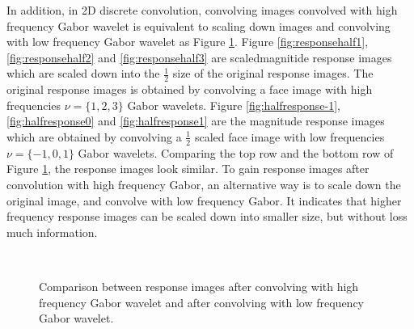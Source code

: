 In addition, in 2D discrete convolution, convolving images convolved with high frequency Gabor wavelet is equivalent to scaling down images and convolving with low frequency Gabor wavelet as \mbox{Figure} \ref{fig:conv2scaledown}. \mbox{Figure} \ref{fig:responsehalf1}, \ref{fig:responsehalf2} and \ref{fig:responsehalf3} are scaledmagnitide response images which are scaled down into the $\frac{1}{2}$ size of the original response images. The original response images is obtained by convolving a face image with high frequencies $\nu = \{1,2,3\}$ Gabor wavelets. \mbox{Figure} \ref{fig:halfresponse-1}, \ref{fig:halfresponse0} and \ref{fig:halfresponse1} are the magnitude response images which are obtained by convolving a $\frac{1}{2}$ scaled face image with low frequencies $\nu=\{-1,0,1\}$ Gabor wavelets. Comparing the top row and the bottom row of \mbox{Figure} \ref{fig:conv2scaledown}, the response images look similar. To gain response images after convolution with high frequency Gabor, an alternative way is to scale down the original image, and convolve with low frequency Gabor. It indicates that higher frequency response images can be scaled down into smaller size, but without loss much information.
\begin{figure}
\begin{center}
   \\
 \caption{Comparison between response images after convolving with high frequency Gabor wavelet and after convolving with low frequency Gabor wavelet.}
\label{fig:conv2scaledown}
\end{center}
\end{figure}
